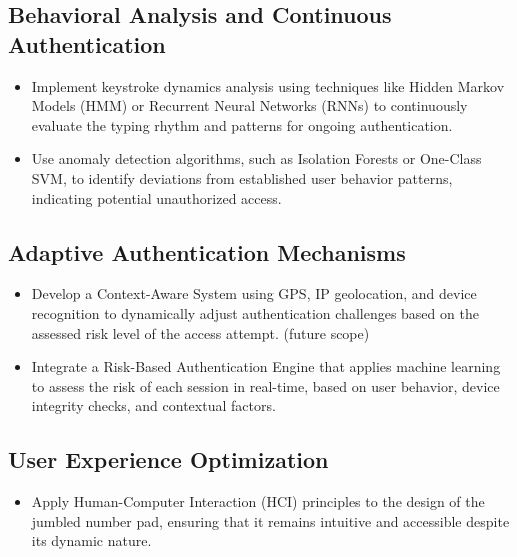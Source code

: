 \documentclass{article}
\begin{document}
\subsection*{Behavioral Analysis and Continuous Authentication}
\begin{itemize}[label=--,leftmargin=*]
    \item Implement keystroke dynamics analysis using techniques like Hidden Markov Models (HMM) or Recurrent Neural Networks (RNNs) to continuously evaluate the typing rhythm and patterns for ongoing authentication.
    \item Use anomaly detection algorithms, such as Isolation Forests or One-Class SVM, to identify deviations from established user behavior patterns, indicating potential unauthorized access.
\end{itemize}

\subsection*{Adaptive Authentication Mechanisms}
\begin{itemize}[label=--,leftmargin=*]
    \item Develop a Context-Aware System using GPS, IP geolocation, and device recognition to dynamically adjust authentication challenges based on the assessed risk level of the access attempt. (future scope)
    \item Integrate a Risk-Based Authentication Engine that applies machine learning to assess the risk of each session in real-time, based on user behavior, device integrity checks, and contextual factors.
\end{itemize}

\subsection*{User Experience Optimization}
\begin{itemize}[label=--,leftmargin=*]
    \item Apply Human-Computer Interaction (HCI) principles to the design of the jumbled number pad, ensuring that it remains intuitive and accessible despite its dynamic nature.
\end{itemize}
\end{document}
